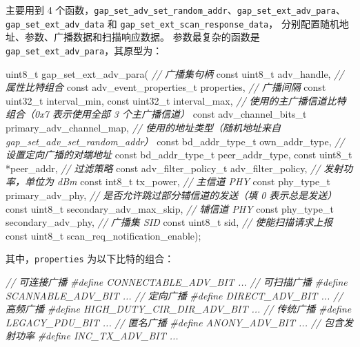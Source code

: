 \documentclass[
  12pt,
]{book}
\newenvironment{Shaded}{\begin{snugshade}}{\end{snugshade}}
\newcommand{\CommentTok}[1]{\textcolor[rgb]{0.56,0.35,0.01}{\textit{#1}}}
\newcommand{\DataTypeTok}[1]{\textcolor[rgb]{0.13,0.29,0.53}{#1}}
\newcommand{\NormalTok}[1]{#1}
\newcommand{\PreprocessorTok}[1]{\textcolor[rgb]{0.56,0.35,0.01}{\textit{#1}}}
\begin{document}
主要用到 4 个函数，\texttt{gap\_set\_adv\_set\_random\_addr}、\texttt{gap\_set\_ext\_adv\_para}、\texttt{gap\_set\_ext\_adv\_data} 和 \texttt{gap\_set\_ext\_scan\_response\_data}，
分别配置随机地址、参数、广播数据和扫描响应数据。
参数最复杂的函数是 \texttt{gap\_set\_ext\_adv\_para}，其原型为：

\begin{Shaded}
\begin{Highlighting}[]
\DataTypeTok{uint8_t}\NormalTok{ gap_set_ext_adv_para(}
    \CommentTok{// 广播集句柄}
    \DataTypeTok{const} \DataTypeTok{uint8_t}\NormalTok{ adv_handle,}
    \CommentTok{// 属性比特组合}
    \DataTypeTok{const}\NormalTok{ adv_event_properties_t properties,}
    \CommentTok{// 广播间隔}
    \DataTypeTok{const} \DataTypeTok{uint32_t}\NormalTok{ interval_min,}
    \DataTypeTok{const} \DataTypeTok{uint32_t}\NormalTok{ interval_max,}
    \CommentTok{// 使用的主广播信道比特组合（0x7 表示使用全部 3 个主广播信道）}
    \DataTypeTok{const}\NormalTok{ adv_channel_bits_t primary_adv_channel_map,}
    \CommentTok{// 使用的地址类型（随机地址来自 gap_set_adv_set_random_addr）}
    \DataTypeTok{const}\NormalTok{ bd_addr_type_t own_addr_type,}
    \CommentTok{// 设置定向广播的对端地址}
    \DataTypeTok{const}\NormalTok{ bd_addr_type_t peer_addr_type,}
    \DataTypeTok{const} \DataTypeTok{uint8_t}\NormalTok{ *peer_addr,}
    \CommentTok{// 过滤策略}
    \DataTypeTok{const}\NormalTok{ adv_filter_policy_t adv_filter_policy,}
    \CommentTok{// 发射功率，单位为 dBm}
    \DataTypeTok{const} \DataTypeTok{int8_t}\NormalTok{ tx_power,}
    \CommentTok{// 主信道 PHY}
    \DataTypeTok{const}\NormalTok{ phy_type_t primary_adv_phy,}
    \CommentTok{// 是否允许跳过部分辅信道的发送（填 0 表示总是发送）}
    \DataTypeTok{const} \DataTypeTok{uint8_t}\NormalTok{ secondary_adv_max_skip,}
    \CommentTok{// 辅信道 PHY}
    \DataTypeTok{const}\NormalTok{ phy_type_t secondary_adv_phy,}
    \CommentTok{// 广播集 SID}
    \DataTypeTok{const} \DataTypeTok{uint8_t}\NormalTok{ sid,}
    \CommentTok{// 使能扫描请求上报}
    \DataTypeTok{const} \DataTypeTok{uint8_t}\NormalTok{ scan_req_notification_enable);}
\end{Highlighting}
\end{Shaded}

其中，\texttt{properties} 为以下比特的组合：

\begin{Shaded}
\begin{Highlighting}[]
\CommentTok{// 可连接广播}
\PreprocessorTok{#define    CONNECTABLE_ADV_BIT       ...}
\CommentTok{// 可扫描广播}
\PreprocessorTok{#define    SCANNABLE_ADV_BIT         ...}
\CommentTok{// 定向广播}
\PreprocessorTok{#define    DIRECT_ADV_BIT            ...}
\CommentTok{// 高频广播}
\PreprocessorTok{#define    HIGH_DUTY_CIR_DIR_ADV_BIT ...}
\CommentTok{// 传统广播}
\PreprocessorTok{#define    LEGACY_PDU_BIT            ...}
\CommentTok{// 匿名广播}
\PreprocessorTok{#define    ANONY_ADV_BIT             ...}
\CommentTok{// 包含发射功率}
\PreprocessorTok{#define    INC_TX_ADV_BIT            ...}
\end{Highlighting}
\end{Shaded}
\end{document}
